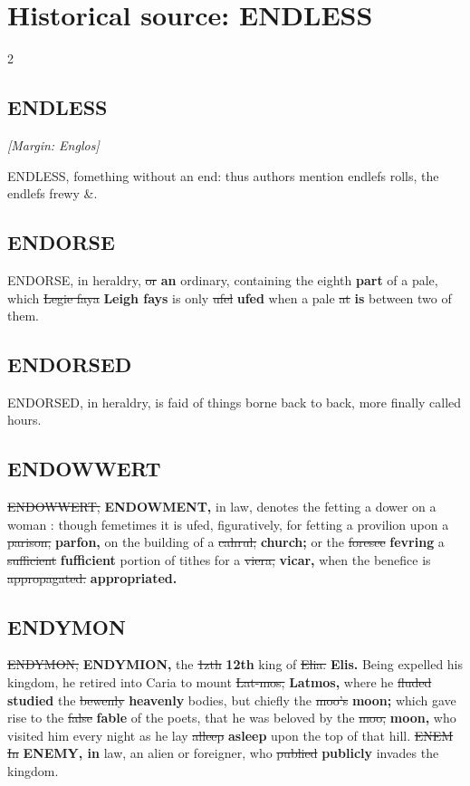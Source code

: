 \documentclass[10pt]{article}
\begin{document}
\section*{Historical source: ENDLESS}
\begin{multicols}{2}
\subsection*{ENDLESS}
{\small\itshape [Margin: Englos]}\par
ENDLESS, fomething without an end: thus authors mention endlefs rolls, the endlefs frewy \&.

\subsection*{ENDORSE}
ENDORSE, in heraldry, \sout{or} \textbf{an} ordinary, containing the eighth \textbf{part} of a pale, which \sout{Legie faya} \textbf{Leigh fays} is only \sout{ufel} \textbf{ufed} when a pale \sout{at} \textbf{is} between two of them.

\subsection*{ENDORSED}
ENDORSED, in heraldry, is faid of things borne back to back, more finally called hours.

\subsection*{ENDOWWERT}
\sout{ENDOWWERT,} \textbf{ENDOWMENT,} in law, denotes the fetting a dower on a woman : though femetimes it is ufed, figuratively, for fetting a provilion upon a \sout{parison,} \textbf{parfon,} on the building of a \sout{cahrul;} \textbf{church;} or the \sout{foresee} \textbf{fevring} a \sout{sufficient} \textbf{fufficient} portion of tithes for a \sout{viera,} \textbf{vicar,} when the benefice is \sout{appropagated.} \textbf{appropriated.}

\subsection*{ENDYMON}
\sout{ENDYMON,} \textbf{ENDYMION,} the \sout{1zth} \textbf{12th} king of \sout{Elia.} \textbf{Elis.} Being expelled his kingdom, he retired into Caria to mount \sout{Lat-mos,} \textbf{Latmos,} where he \sout{fluded} \textbf{studied} the \sout{bewenly} \textbf{heavenly} bodies, but chiefly the \sout{moo's} \textbf{moon;} which gave rise to the \sout{false} \textbf{fable} of the poets, that he was beloved by the \sout{moo,} \textbf{moon,} who visited him every night as he lay \sout{alleep} \textbf{asleep} upon the top of that hill. \sout{ENEM In} \textbf{ENEMY, in} law, an alien or foreigner, who \sout{publied} \textbf{publicly} invades the kingdom.


\end{multicols}
\end{document}
